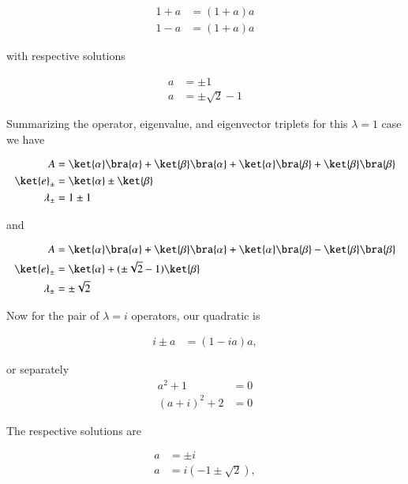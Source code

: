 \begin{align}\label{eqn:desaiDiracNotes:65}
1 + a &= (1 + a ) a \\
1 - a &= (1 + a ) a
\end{align}

with respective solutions

\begin{align}\label{eqn:desaiDiracNotes:66}
a &= \pm 1 \\
a &= \pm \sqrt{2} - 1
\end{align}

Summarizing the operator, eigenvalue, and eigenvector triplets for this $\lambda = 1$ case we have

\begin{subequations}
\label{eqn:desaiDiracNotes:67}
\begin{align}
A &=
\ket{\alpha}\bra{\alpha}
+ \ket{\beta}\bra{\alpha}
+ \ket{\alpha}\bra{\beta}
+ \ket{\beta}\bra{\beta} \\
\ket{e}_{\pm} &= \ket{\alpha} \pm \ket{\beta} \\
\lambda_{\pm} &= 1 \pm 1 
\end{align}
\end{subequations}

and

\begin{subequations}
\label{eqn:desaiDiracNotes:68}
\begin{align}
A &=
\ket{\alpha}\bra{\alpha}
+ \ket{\beta}\bra{\alpha}
+ \ket{\alpha}\bra{\beta}
- \ket{\beta}\bra{\beta} \\
\ket{e}_{\pm} &= \ket{\alpha} + (\pm \sqrt{2} - 1) \ket{\beta} \\
\lambda_{\pm} &= \pm \sqrt{2}
\end{align}
\end{subequations}

Now for the pair of $\lambda = i$ operators, our quadratic is

\begin{align}\label{eqn:desaiDiracNotes:64i}
i \pm a &= (1 - i a) a,
\end{align}

or separately
\begin{align}\label{eqn:desaiDiracNotes:64ii}
a^2 + 1 &= 0 \\
(a + i)^2 + 2 &= 0
\end{align}

The respective solutions are

\begin{align}\label{eqn:desaiDiracNotes:66i}
a &= \pm i \\
a &= i (-1 \pm \sqrt{2} ),
\end{align}

